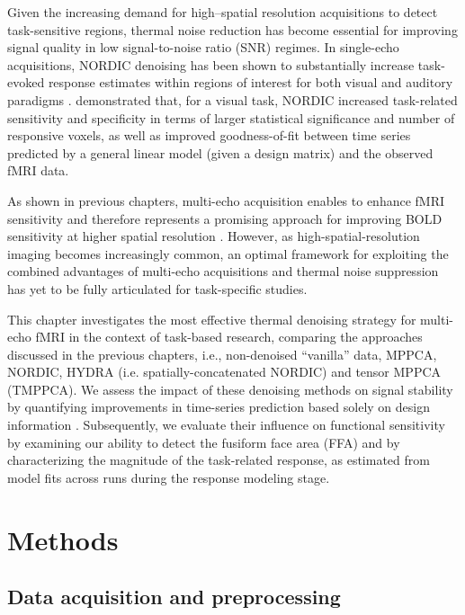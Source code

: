 Given the increasing demand for high–spatial resolution acquisitions to detect task-sensitive regions, thermal noise reduction has become essential for improving signal quality in low signal-to-noise ratio (SNR) regimes. In single-echo acquisitions, NORDIC denoising has been shown to substantially increase task-evoked response estimates within regions of interest for both visual and auditory paradigms \citep{vizioli2021lowering, dowdle2023evaluating, faesEvaluatingEffectDenoising2024}. \citet{dowdle2023evaluating} demonstrated that, for a visual task, NORDIC increased task-related sensitivity and specificity in terms of larger statistical significance and number of responsive voxels, as well as improved goodness-of-fit between time series predicted by a general linear model (given a design matrix) and the observed fMRI data.

As shown in previous chapters, multi-echo acquisition enables to enhance fMRI sensitivity and therefore represents a promising approach for improving BOLD sensitivity at higher spatial resolution \citep{kundu2012differentiating}. However, as high-spatial-resolution imaging becomes increasingly common, an optimal framework for exploiting the combined advantages of multi-echo acquisitions and thermal noise suppression has yet to be fully articulated for task-specific studies. 

This chapter investigates the most effective thermal denoising strategy for multi-echo fMRI in the context of task-based research, comparing the approaches discussed in the previous chapters, i.e., non-denoised “vanilla” data, MPPCA, NORDIC, HYDRA (i.e. spatially-concatenated NORDIC) and tensor MPPCA (TMPPCA). We assess the impact of these denoising methods on signal stability by quantifying improvements in time-series prediction based solely on design information \citep{princeImprovingAccuracySingletrial2022, dowdle2023evaluating}. Subsequently, we evaluate their influence on functional sensitivity by examining our ability to detect the fusiform face area (FFA) \citep{bermanEvaluatingFunctionalLocalizers2010} and by characterizing the magnitude of the task-related response, as estimated from model fits across runs during the response modeling stage.

\section{Methods}

\subsection{Data acquisition and preprocessing}
\label{ImageParametersT}

